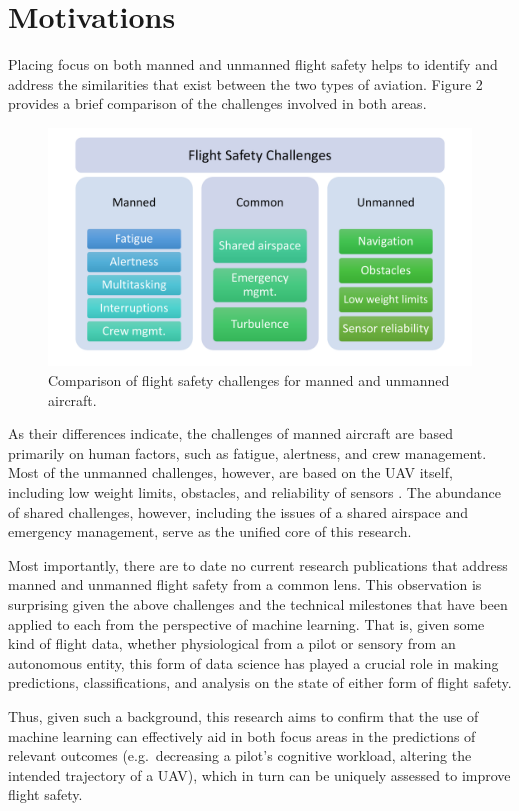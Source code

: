 \documentclass[12pt]{uthesis-v12}  %
\begin{document}
\section{Motivations}

Placing focus on both manned and unmanned flight safety helps to identify and address the similarities that exist between the two types of aviation. Figure 2 provides a brief comparison of the challenges involved in both areas.
\begin{figure}[!t]
\centering
\includegraphics[width=6in]{challenges}
\caption{Comparison of flight safety challenges for manned and unmanned aircraft.}
\label{challenges}
\end{figure}
As their differences indicate, the challenges of manned aircraft are based primarily on human factors, such as fatigue, alertness, and crew management. Most of the unmanned challenges, however, are based on the UAV itself, including low weight limits, obstacles, and reliability of sensors \cite{hardin}. The abundance of shared challenges, however, including the issues of a shared airspace and emergency management, serve as the unified core of this research.

Most importantly, there are to date no current research publications that address manned and unmanned flight safety from a common lens. This observation is surprising given the above challenges and the technical milestones that have been applied to each from the perspective of machine learning. That is, given some kind of flight data, whether physiological from a pilot or sensory from an autonomous entity, this form of data science has played a crucial role in making predictions, classifications, and analysis on the state of either form of flight safety.

Thus, given such a background, this research aims to confirm that the use of machine learning can effectively aid in both focus areas in the predictions of relevant outcomes (e.g.~decreasing a pilot's cognitive workload, altering the intended trajectory of a UAV), which in turn can be uniquely assessed to improve flight safety.
\end{document}
